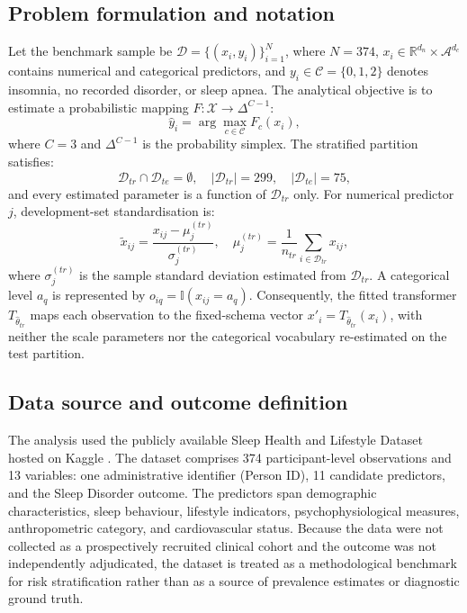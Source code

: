 \documentclass{turkjour}%
\begin{document}
\subsection{Problem formulation and notation}
Let the benchmark sample be $\mathcal{D} = \{(x_i, y_i)\}_{i=1}^N$, where $N=374$, $x_i \in \mathbb{R}^{d_n} \times \mathcal{A}^{d_c}$ contains numerical and categorical predictors, and $y_i \in \mathcal{C} = \{0, 1, 2\}$ denotes insomnia, no recorded disorder, or sleep apnea. The analytical objective is to estimate a probabilistic mapping $F: \mathcal{X} \rightarrow \Delta^{C-1}$:
\begin{equation}
\hat{y}_i = \arg \max_{c \in \mathcal{C}} F_c(x_i),
\end{equation}
where $C=3$ and $\Delta^{C-1}$ is the probability simplex. The stratified partition satisfies:
\begin{equation}
\mathcal{D}_{tr} \cap \mathcal{D}_{te} = \emptyset, \quad |\mathcal{D}_{tr}| = 299, \quad |\mathcal{D}_{te}| = 75,
\end{equation}
and every estimated parameter is a function of $\mathcal{D}_{tr}$ only. For numerical predictor $j$, development-set standardisation is:
\begin{equation}
\tilde{x}_{ij} = \frac{x_{ij} - \mu_j^{(tr)}}{\sigma_j^{(tr)}}, \quad \mu_j^{(tr)} = \frac{1}{n_{tr}} \sum_{i \in \mathcal{D}_{tr}} x_{ij},
\end{equation}
where $\sigma_j^{(tr)}$ is the sample standard deviation estimated from $\mathcal{D}_{tr}$. A categorical level $a_q$ is represented by $o_{iq} = \mathbb{I}(x_{ij} = a_q)$. Consequently, the fitted transformer $T_{\hat{\theta}_{tr}}$ maps each observation to the fixed-schema vector $x'_i = T_{\hat{\theta}_{tr}}(x_i)$, with neither the scale parameters nor the categorical vocabulary re-estimated on the test partition.

\subsection{Data source and outcome definition}
The analysis used the publicly available Sleep Health and Lifestyle Dataset hosted on Kaggle \cite{Kaggle2023}. The dataset comprises 374 participant-level observations and 13 variables: one administrative identifier (Person ID), 11 candidate predictors, and the Sleep Disorder outcome. The predictors span demographic characteristics, sleep behaviour, lifestyle indicators, psychophysiological measures, anthropometric category, and cardiovascular status. Because the data were not collected as a prospectively recruited clinical cohort and the outcome was not independently adjudicated, the dataset is treated as a methodological benchmark for risk stratification rather than as a source of prevalence estimates or diagnostic ground truth.
\end{document}
